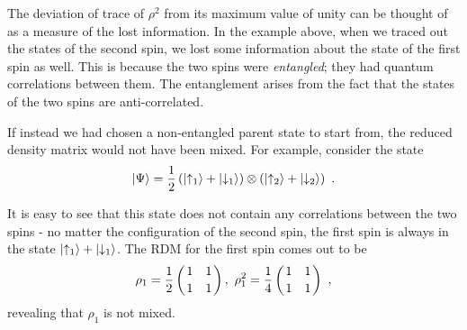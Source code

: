 The deviation of trace of $\rho^2$ from its maximum value of unity can be thought of as a measure of the lost information. In the example above, when we traced out the states of the second spin, we lost some information about the state of the first spin as well. This is because the two spins were {\it entangled}; they had quantum correlations between them. The entanglement arises from the fact that the states of the two spins are anti-correlated.

If instead we had chosen a non-entangled parent state to start from, the reduced density matrix would not have been mixed. For example, consider the state
\begin{equation}\begin{aligned}
\ket{\Psi} = \frac{1}{2}\left(\ket{\uparrow_1} + \ket{\downarrow_1}\right)\otimes\left(\ket{\uparrow_2} + \ket{\downarrow_2}\right) ~.
\end{aligned}\end{equation}

It is easy to see that this state does not contain any correlations between the two spins - no matter the configuration of the second spin, the first spin is always in the state $ \ket{\uparrow_1} + \ket{\downarrow_1} $. The RDM for the first spin comes out to be
\begin{equation}\begin{aligned}
\rho_1 = \frac{1}{2}\left({1 \quad 1}\atop{1 \quad 1}\right),~ \rho_1^2 = \frac{1}{4}\left({1 \quad 1}\atop{1 \quad 1}\right)~,
\end{aligned}\end{equation}
revealing that $ \rho_1 $ is not mixed.

